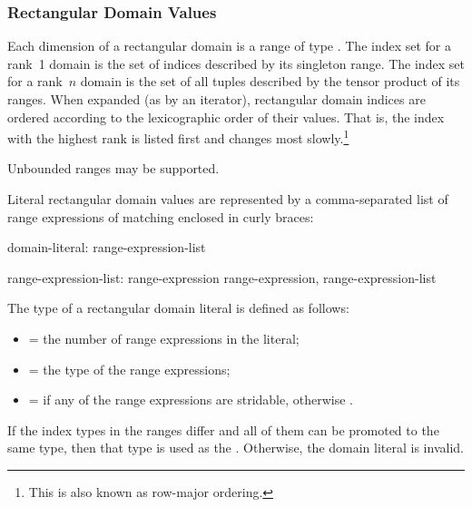 \subsubsection{Rectangular Domain Values}
\label{Rectangular_Domain_Values}

Each dimension of a rectangular domain is a range of
type   .  The index set for a rank~1 domain is the set of indices
described by its singleton range.  The index set for a rank~$n$
domain is the set of all  tuples described by the
tensor product of its ranges.  When expanded (as by an iterator), rectangular domain indices are ordered
according to the lexicographic order of their values.  That is, the index with
the highest rank is listed first and changes most slowly.\footnote{This is also
known as row-major ordering.}



\begin{future}
Unbounded ranges may be supported.
\end{future}


Literal rectangular domain values are represented by a comma-separated
list of range expressions of matching  enclosed in
curly braces:


\begin{syntax}
domain-literal:
  { range-expression-list }

range-expression-list:
  range-expression
  range-expression, range-expression-list
\end{syntax}

\noindent The type of a rectangular domain literal is defined as follows:

\begin{itemize}
\item {} = the number of range expressions in the literal;
\item {} = the type of the range expressions;
\item {} =  if any of the range expressions
are stridable, otherwise .
\end{itemize}
\noindent If the index types in the ranges differ and all of them can be
promoted to the same type, then that type is used as the .
Otherwise, the domain literal is invalid.

